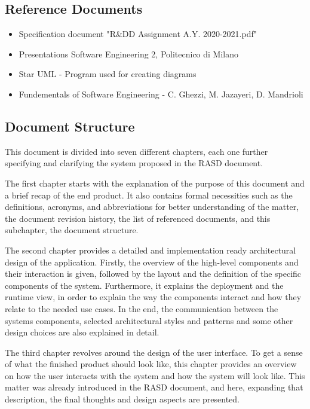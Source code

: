 \newpage
\subsection{Reference Documents}
\begin{itemize}
	\item Specification document "R\&DD Assignment A.Y. 2020-2021.pdf"
	\item Presentations Software Engineering 2, Politecnico di Milano
	\item Star UML - Program used for creating diagrams
	\item Fundementals of Software Engineering - C. Ghezzi, M. Jazayeri, D. Mandrioli
\end{itemize}


\newpage
\subsection{Document Structure}
\hspace{\parindent} This document is divided into seven different chapters, each one further specifying and clarifying the system proposed in the RASD document. \newline

The first chapter starts with the explanation of the purpose of this document and a brief recap of the end product. It also contains formal necessities such as the definitions, acronyms, and abbreviations for better understanding of the matter, the document revision history, the list of referenced documents, and this subchapter, the document structure. \newline 

The second chapter provides a detailed and implementation ready architectural design of the application. Firstly, the overview of the high-level components and their interaction is given, followed by the layout and the definition of the specific components of the system. Furthermore, it explains the deployment and the runtime view, in order to explain the way the components interact and how they relate to the needed use cases. In the end, the communication between the systems components, selected architectural styles and patterns and some other design choices are also explained in detail. \newline

The third chapter revolves around the design of the user interface. To get a sense of what the finished product should look like, this chapter provides an overview on how the user interacts with the system and how the system will look like. This matter was already introduced in the RASD document, and here, expanding that description, the final thoughts and design aspects are presented. \newline

